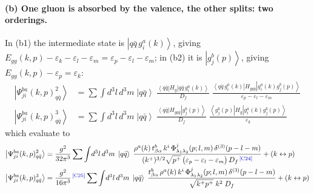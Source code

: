 \documentclass[11pt]{article}
\newcommand{\eps}{\varepsilon}
\newcommand{\dthree}{\delta^{(3)}}
\newcommand{\ket}[1]{\left|#1\right\rangle}
\newcommand{\bra}[1]{\left\langle#1\right|}
\newcommand{\Ph}{\Phi}
\newcommand{\qk}[3]{q^{#1}_{#2}(#3)}
\newcommand{\aqk}[3]{\bar q^{#1}_{#2}(#3)}
\newcommand{\gl}[3]{g^{#1}_{#2}(#3)}
\newcommand{\chg}[1]{{\color{blue!70!black}\textsuperscript{\,[C#1]}}}
\begin{document}
\paragraph{(b) One gluon is absorbed by the valence, the other splits: two orderings.}
\begin{center}
\hspace{0.5cm}
\end{center}
In (b1) the intermediate state is $\ket{q\bar q\,\gl{a}{i}{k}}$, giving
$E_{gg}(k,p)-\eps_{k}-\eps_{l}-\eps_{m}=\eps_{p}-\eps_{l}-\eps_{m}$; in (b2) it is
$\ket{\gl{b}{j}{p}}$, giving $E_{gg}(k,p)-\eps_{p}=\eps_{k}$:
\begin{align}
\ket{\Psi^{ba}_{ji}(k,p)^{2}_{q\bar q}}&=\sum\int\!d^{3}l\,d^{3}m\;\ket{q\bar q}\;
\frac{\bra{q\bar q}H_{g}\ket{q\bar q\,\gl{a}{i}{k}}}{D_{f}}\;
\frac{\bra{q\bar q\,\gl{a}{i}{k}}H_{gq\bar q}\ket{\gl{a}{i}{k}\gl{b}{j}{p}}}
{\eps_{p}-\eps_{l}-\eps_{m}}
\\
\ket{\Psi^{ba}_{ji}(k,p)^{3}_{q\bar q}}&=\sum\int\!d^{3}l\,d^{3}m\;\ket{q\bar q}\;
\frac{\bra{q\bar q}H_{gq\bar q}\ket{\gl{b}{j}{p}}}{D_{f}}\;
\frac{\bra{\gl{b}{j}{p}}H_{g}\ket{\gl{a}{i}{k}\gl{b}{j}{p}}}{\eps_{k}}
\end{align}
which evaluate to
\begin{align}
\ket{\Psi^{ba}_{ji}(k,p)^{2}_{q\bar q}}&=\frac{g^{2}}{32\pi^{3}}\sum\int\!d^{3}l\,d^{3}m\;
\ket{q\bar q}\;
\frac{\rho^{a}(k)\,t^{b}_{\beta\alpha}\,k^{i}\,\Ph^{j}_{\lambda_{1}\lambda_{2}}(p;l,m)\,
\dthree(p-l-m)}
{(k^{+})^{3/2}\sqrt{p^{+}}\,\big(\eps_{p}-\eps_{l}-\eps_{m}\big)\,D_{f}\chg{24}}+(k\leftrightarrow p)
\label{eq:C1b1}\\
\ket{\Psi^{ba}_{ji}(k,p)^{3}_{q\bar q}}&=\frac{g^{2}}{16\pi^{3}}\chg{25}
\sum\int\!d^{3}l\,d^{3}m\;\ket{q\bar q}\;
\frac{t^{b}_{\beta\alpha}\,\rho^{a}(k)\,k^{i}\,\Ph^{j}_{\lambda_{1}\lambda_{2}}(p;l,m)\,
\dthree(p-l-m)}{\sqrt{k^{+}p^{+}}\;k^{2}\;D_{f}}+(k\leftrightarrow p)
\label{eq:C1b2}
\end{align}
\end{document}

